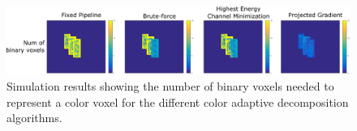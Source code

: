 \begin{figure}[h!]
\centering
\includegraphics[width=0.99\columnwidth]{images/volumetric/cad_results/cad_num_binary_voxels}
\caption[Color Adaptive Decomposition: number of binary voxels]{Simulation results showing the number of binary voxels needed to represent a color voxel for the different color adaptive decomposition algorithms.}
\label{fig:volumetric:cad:num_binary_voxels}
\end{figure}

